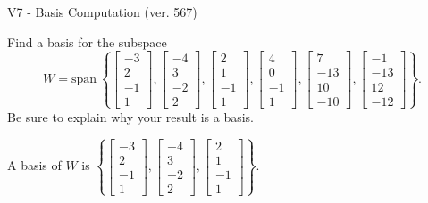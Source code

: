 \begin{exercise}
  \begin{exerciseTitle}V7 - Basis Computation (ver. 567)\end{exerciseTitle}
  \begin{exerciseStatement}
    Find a basis for the subspace 
\[W=\mathrm{span}\ \left\{\left[\begin{array}{r}
-3 \\
2 \\
-1 \\
1
\end{array}\right] , \left[\begin{array}{r}
-4 \\
3 \\
-2 \\
2
\end{array}\right] , \left[\begin{array}{r}
2 \\
1 \\
-1 \\
1
\end{array}\right] , \left[\begin{array}{r}
4 \\
0 \\
-1 \\
1
\end{array}\right] , \left[\begin{array}{r}
7 \\
-13 \\
10 \\
-10
\end{array}\right] , \left[\begin{array}{r}
-1 \\
-13 \\
12 \\
-12
\end{array}\right]\right\}.\]
 Be sure to explain why your result is a basis.


  \end{exerciseStatement}
  \begin{exerciseAnswer}
   A basis of \(W\) is  \(\left\{\left[\begin{array}{r}
-3 \\
2 \\
-1 \\
1
\end{array}\right] , \left[\begin{array}{r}
-4 \\
3 \\
-2 \\
2
\end{array}\right] , \left[\begin{array}{r}
2 \\
1 \\
-1 \\
1
\end{array}\right]\right\}\).
  


  \end{exerciseAnswer}
\end{exercise}